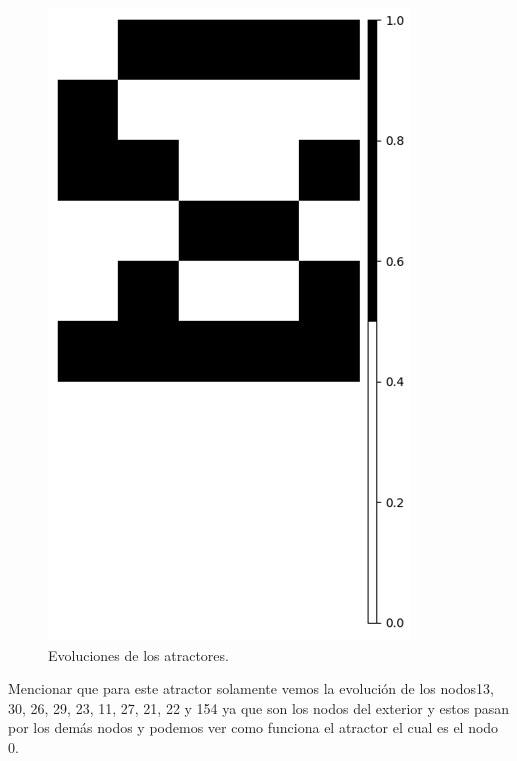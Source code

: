 \documentclass[11pt]{article}
\begin{document}
\begin{figure}[H]
			\includegraphics[scale=0.3]{resources/Atractores54/atractor_54_size_5_res3.png}
			\caption{Evoluciones de los atractores.}\label{fig:picture}
			\end{figure}
			Mencionar que para este atractor solamente vemos la evolución de los nodos13, 30, 26, 29, 23, 11, 27, 21, 22 y 154 ya que son los nodos del exterior y estos pasan por los demás nodos y podemos ver como funciona el atractor el cual es el nodo 0.
\end{document}
